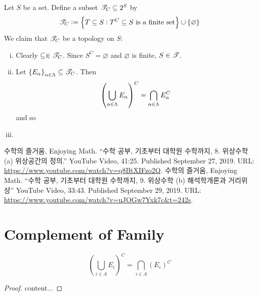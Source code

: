 \documentclass[11pt,openany]{article}
\begin{document}
\newpage
\begin{example}
	Let $S$ be a set. Define a subset $\mathscr{T}_C\subseteq 2^S$ by \[
	\topology_C:=\set{T\subseteq S:T^C\subseteq S\ \text{is a finite set}}\cup\set{\varnothing}
	\] We claim that $\mathscr{T}_C$ be a topology on $S$:
	\begin{enumerate}[(i)]
		\item Clearly $\subseteq\in\mathscr{T}_C$. Since $S^C=\varnothing$ and $\varnothing$ is finite, $S\in\mathscr{T}$.
		\item Let $\set{E_\alpha}_{\alpha\in\Lambda}\subseteq\mathscr{T}_C$. Then \[
		\left( \bigcup_{\alpha\in\Lambda} E_\alpha \right)^C=\bigcap_{\alpha\in\Lambda}E_\alpha^C
		\] and so
		\item 
	\end{enumerate}
\end{example}

\begin{example}
	
\end{example}

\begin{example}
	
\end{example}


\newpage
{}


\vfill
\begin{thebibliography}{9}
	수학의 즐거움, Enjoying Math. ``수학 공부, 기초부터 대학원 수학까지, 8. 위상수학 (a) 위상공간의 정의.'' YouTube Video, 41:25. Published 
	September 27, 2019. URL: \url{https://www.youtube.com/watch?v=q8BtXIFzo2Q}.
	수학의 즐거움, Enjoying Math. ``수학 공부, 기초부터 대학원 수학까지, 9. 위상수학 (b) 해석학개론과 거리위상'' YouTube Video, 33:43. Published 
	September 29, 2019. URL: \url{https://www.youtube.com/watch?v=uJOGw7Yxk7c&t=242s}.
\end{thebibliography}
\appendix
\section{Complement of Family}
\begin{note}
	\[
	\left(\bigcup_{i\in\Lambda}E_i\right)^C=
	\bigcap_{i\in\Lambda}\left(E_i\right)^C
	\]
	\begin{proof}
		content...
	\end{proof}
\end{note}
\end{document}
